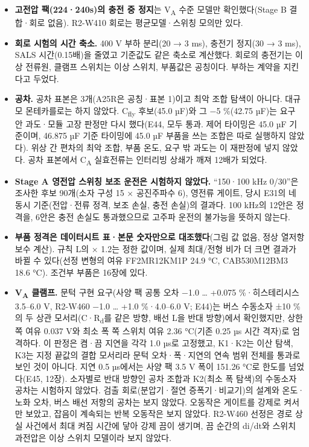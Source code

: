 \begin{itemize}
\item \textbf{고전압 팩(224·240s)의 충전 중 정지}는 V\textsubscript{A} 수준 모델만 확인했다(Stage B 결합·회로 없음). R2-W410 회로는 평균모델·스위칭 모의만 있다.
\item \textbf{회로 시험의 시간 축소.} 400 V 부하 분리(20 → 3 ms), 충전기 정지(30 → 3 ms), SALS 시간(0.15배)을 줄였고 기준값도 같은 축소로 계산했다. 회로의 충전기는 이상 전류원, 클램프 스위치는 이상 스위치, 부품값은 공칭이다. 부하는 계약을 지킨다고 두었다.
\item \textbf{공차.} 공차 표본은 3개(A25R은 공칭·표본 1)이고 최악 조합 탐색이 아니다. 대규모 몬테카를로는 하지 않았다. C\textsubscript{fly} 후보(45.0 µF)와 그 −5 \%(42.75 µF)는 요구 안 과도·모듈 고장 판정만 다시 했다(E44, 모두 통과. 제어 타이밍은 45.0 µF 기준이며, 46.875 µF 기준 타이밍에 45.0 µF 부품을 쓰는 조합은 따로 실행하지 않았다). 위상 간 편차의 최악 조합, 부품 온도, 요구 밖 과도는 이 재판정에 넣지 않았다. 공차 표본에서 C\textsubscript{A} 실효전류는 인터리빙 상쇄가 깨져 12배가 되었다.
\item \textbf{Stage A 영전압 스위칭 보조 운전은 시험하지 않았다.} “150·100 kHz 0/30”은 조사한 후보 90개(소자 구성 15 × 공진주파수 6), 영전류 게이트, 당시 E31의 네 동시 기준(전압·전류 정격, 보조 손실, 충전 손실)의 결과다. 100 kHz의 12안은 정격을, 6안은 충전 손실도 통과했으므로 고주파 운전의 불가능을 뜻하지 않는다.
\item \textbf{부품 정격은 데이터시트 표·본문 숫자만으로 대조했다}(그림 값 없음, 정상 열저항 보수 계산). 규칙 L의 × 1.2는 정한 값이며, 실제 최대/전형 비가 더 크면 결과가 바뀔 수 있다(선정 변형의 여유 FF2MR12KM1P 24.9 °C, CAB530M12BM3 18.6 °C). 조건부 부품은 16장에 있다.
\item \textbf{V\textsubscript{A} 클램프.} 문턱 구현 요구(사양 팩 공통 오차 −1.0 … +0.075 \%·히스테리시스 3.5–6.0 V, R2-W460 −1.0 … +1.0 \%·4.0–6.0 V; E44)는 버스 수동소자 ±10 \%의 두 상관 모서리(C·R\textsubscript{d}를 같은 방향, 배선 L을 반대 방향)에서 확인했지만, 상한 쪽 여유 0.037 V와 최소 폭 쪽 스위치 여유 2.36 °C(기존 0.25 µs 시간 격자)로 엄격하다. 이 판정은 켬·끔 지연을 각각 1.0 µs로 고정했고, K1·K2는 이산 탐색, K3는 지정 끝값의 결합 모서리라 문턱 오차·폭·지연의 연속 범위 전체를 통과로 보인 것이 아니다. 지연 0.5 µs에서는 사양 팩 3.5 V 폭이 151.26 °C로 한도를 넘었다(E45, 12장). 소자별로 반대 방향인 공차 조합과 K2(최소 폭 탐색)의 수동소자 공차는 시험하지 않았다. 검출 회로(분압기·절연 증폭기·비교기)의 설계와 온도·노화 오차, 버스 배선 저항의 공차는 보지 않았다. 오동작은 게이트를 강제로 켜서만 보았고, 잡음이 계속되는 반복 오동작은 보지 않았다. R2-W460 선정은 경로 상실 사건에서 최대 켜짐 시간에 닿아 강제 끔이 생기며, 끔 순간의 di/dt와 스위치 과전압은 이상 스위치 모델이라 보지 않았다.

\end{itemize}
